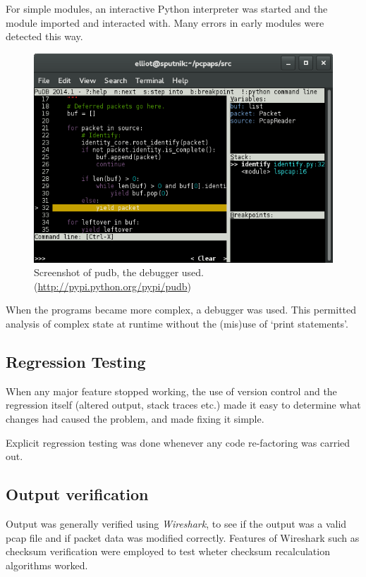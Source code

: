 \documentclass[10pt,a4paper,notitlepage]{report}
\begin{document}
For simple modules, an interactive Python interpreter was started and the module imported and interacted with. Many errors in early modules were detected this way.

\begin{figure}[H]
\center
\includegraphics[scale=0.75]{pictures/pudb.png}
\caption{Screenshot of pudb, the debugger used. (\url{http://pypi.python.org/pypi/pudb})}
\end{figure}

When the programs became more complex, a debugger was used. This permitted analysis of complex state at runtime without the (mis)use of `print statements'.

\subsection{Regression Testing}
When any major feature stopped working, the use of version control and the regression itself (altered output, stack traces etc.) made it easy to determine what changes had caused the problem, and made fixing it simple.

Explicit regression testing was done whenever any code re-factoring was carried out.

\subsection{Output verification}
Output was generally verified using \emph{Wireshark}, to see if the output was a valid pcap file and if packet data was modified correctly. Features of Wireshark such as checksum verification were employed to test wheter checksum recalculation algorithms worked.
\end{document}
